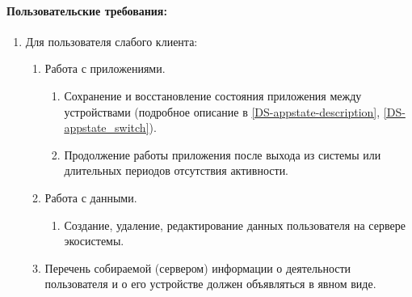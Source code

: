 \paragraph*{Пользовательские требования:}
\begin{enumerate}[label={\bfseries ПТ-\arabic*.}]
   \item Для пользователя слабого клиента:
         \begin{enumerate}[label*={\bfseries\arabic*.}]
            \item Работа с приложениями.
                  \begin{enumerate}[nosep,label*={\bfseries\arabic*.}]
                     \item Сохранение и восстановление состояния приложения между устройствами (подробное описание в \ref{DS-appstate-description}, \ref{DS-appstate_switch}).
                     \item Продолжение работы приложения после выхода из системы или длительных периодов отсутствия активности.
                  \end{enumerate}
            \item Работа с данными.
                  \begin{enumerate}[nosep,label*={\bfseries\arabic*.}]
                     \item Создание, удаление, редактирование данных пользователя на сервере экосистемы.
                  \end{enumerate}
            \item Перечень собираемой (сервером) информации о деятельности пользователя и о его устройстве должен объявляться в явном виде.
         \end{enumerate}
         

\end{enumerate}
